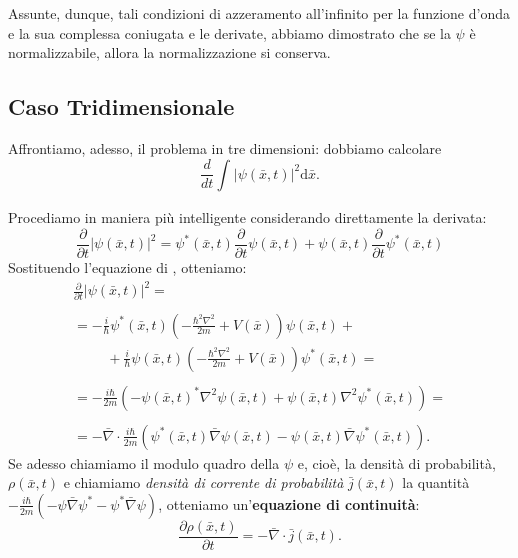 Assunte, dunque, tali condizioni di azzeramento all'infinito per la funzione d'onda e la sua complessa coniugata e le derivate, abbiamo dimostrato che se la $\psi$ è normalizzabile, allora la normalizzazione si conserva. 

\subsection{Caso Tridimensionale} %
Affrontiamo, adesso, il problema in tre dimensioni:
dobbiamo calcolare 
\begin{equation} \label{normb}
\frac{d}{dt}\int_{}^{}{|\psi \left(\bar x,t\right)|^2 \textrm{d}\bar x}.
\end{equation}

Procediamo in maniera più intelligente
considerando direttamente la derivata:
\begin{equation}
\frac{\partial }{\partial t}|\psi \left(\bar x,t\right)|^2=\psi^*\left(\bar x,t\right)\frac{\partial }{\partial t}\psi\left(\bar x,t\right) +\psi \left(\bar x,t\right)\frac{\partial }{\partial t}\psi^*\left(\bar x,t\right)
\end{equation}
Sostituendo l'equazione di \scha, otteniamo:
\begin{equation}
\begin{array}{l}
\frac{\partial }{\partial t}|\psi \left(\bar x,t\right)|^2= \\ \\ =-\frac{i}{\hbar }\psi ^*\left(\bar x,t\right)\left(-\frac{\hbar ^2\nabla ^2}{2m}+V\left(\bar x\right)\right)\psi \left(\bar x,t\right)+ \\
\hspace{1cm}+\frac{i}{\hbar }\psi\left(\bar x,t\right) \left(-\frac{\hbar ^2\nabla ^2}{2m}+V\left(\bar x\right)\right)\psi^*\left(\bar x,t\right)=\\ \\
=-\frac{i\hbar }{2m}\left(-\psi\left(\bar x,t\right) ^*\nabla ^2\psi\left(\bar x,t\right) +\psi\left(\bar x,t\right) \nabla ^2\psi ^*\left(\bar x,t\right)\right)=\\ \\
=-\bar \nabla \cdot \frac{i\hbar }{2m}\left(\psi ^*\left(\bar x,t\right)\bar \nabla \psi\left(\bar x,t\right) -\psi\left(\bar x,t\right) \bar \nabla \psi ^*\left(\bar x,t\right)\right).
\end{array}
\end{equation}
Se adesso chiamiamo il modulo quadro della $\psi$ e, cioè, la densità di probabilità, $\rho(\bar x,t)$ e chiamiamo \emph{densità di corrente di probabilità} $\bar j\left(\bar x,t\right)$ la quantità $-\frac{i\hbar }{2m}\left(-\psi\bar \nabla \psi^* -\psi^* \bar \nabla \psi \right)$, otteniamo un'\textbf{equazione di continuità}:
\begin{equation}
\frac{\partial \rho \left(\bar x,t\right)}{\partial t}=-\bar \nabla \cdot \bar j\left(\bar x,t\right).
\end{equation}

